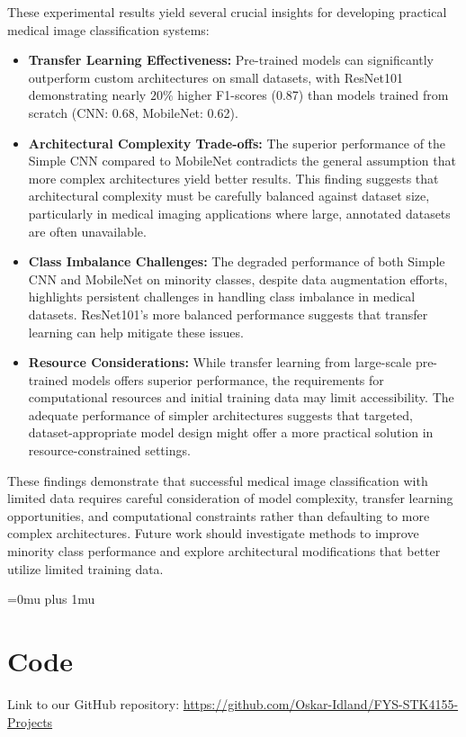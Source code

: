 \documentclass[aps,pra,english,notitlepage,reprint,nofootinbib]{revtex4-1}  %
\begin{document}
These experimental results yield several crucial insights for developing practical medical image classification systems:

\begin{itemize}
    \item \textbf{Transfer Learning Effectiveness:} Pre-trained models can significantly outperform custom architectures on small datasets,  with ResNet101 demonstrating nearly $20\%$ higher F1-scores (0.87) than models trained from scratch (CNN: 0.68, MobileNet: 0.62).
    \item \textbf{Architectural Complexity Trade-offs:} The superior performance of the Simple CNN compared to MobileNet contradicts the general assumption that more complex architectures yield better results. This finding suggests that architectural complexity must be carefully balanced against dataset size, particularly in medical imaging applications where large, annotated datasets are often unavailable.
    \item \textbf{Class Imbalance Challenges:} The degraded performance of both Simple CNN and MobileNet on minority classes, despite data augmentation efforts, highlights persistent challenges in handling class imbalance in medical datasets. ResNet101's more balanced performance suggests that transfer learning can help mitigate these issues.
    \item \textbf{Resource Considerations:} While transfer learning from large-scale pre-trained models offers superior performance, the requirements for computational resources and initial training data may limit accessibility. The adequate performance of simpler architectures suggests that targeted, dataset-appropriate model design might offer a more practical solution in resource-constrained settings. 
\end{itemize}

These findings demonstrate that successful medical image classification with limited data requires careful consideration of model complexity, transfer learning opportunities, and computational constraints rather than defaulting to more complex architectures. Future work should investigate methods to improve minority class performance and explore architectural modifications that better utilize limited training data.

\Urlmuskip=0mu plus 1mu\relax
\onecolumngrid


\newpage
\appendix
\section{Code}\label{appsec:code}
Link to our GitHub repository: \href{https://github.com/Oskar-Idland/FYS-STK4155-Projects}{https://github.com/Oskar-Idland/FYS-STK4155-Projects}
\end{document}
